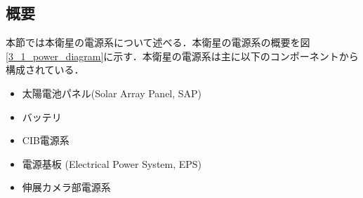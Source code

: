 \subsection{概要}
本節では本衛星の電源系について述べる．本衛星の電源系の概要を図\ref{3_1_power_diagram}に示す．本衛星の電源系は主に以下のコンポーネントから構成されている．
\begin{itemize}
	\item 太陽電池パネル(Solar Array Panel, SAP)
	\item バッテリ
	\item CIB電源系
	\item 電源基板 (Electrical Power System, EPS)
	\item 伸展カメラ部電源系
\end{itemize}


